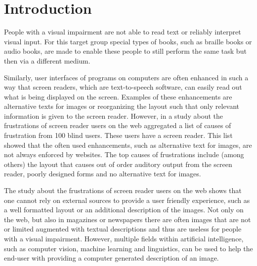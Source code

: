 \section{Introduction}
People with a visual impairment are not able to read text or reliably interpret visual input. For this target group special types of books, such as braille books or audio books, are made to enable these people to still perform the same task but then via a different medium. 

Similarly, user interfaces of programs on computers are often enhanced in such a way that screen readers, which are text-to-speech software, can easily read out what is being displayed on the screen. Examples of these enhancements are alternative texts for images or reorganizing the layout such that only relevant information is given to the screen reader. However, in a study about the frustrations of screen reader users on the web \citeauthor{lazar2007frustrates} \cite{lazar2007frustrates} aggregated a list of causes of frustration from 100 blind users. These users have a screen reader. This list showed that the often used enhancements, such as alternative text for images, are not always enforced by websites. The top causes of frustrations include (among others) the layout that causes out of order auditory output from the screen reader, poorly designed forms and no alternative text for images. 

The study about the frustrations of screen reader users on the web shows that one cannot rely on external sources to provide a user friendly experience, such as a well formatted layout or an additional description of the images. Not only on the web, but also in magazines or newspapers there are often images that are not or limited augmented with textual descriptions and thus are useless for people with a visual impairment. However, multiple fields within artificial intelligence, such as computer vision, machine learning and linguistics, can be used to help the end-user with providing a computer generated description of an image. 

